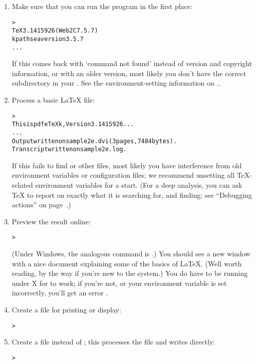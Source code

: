 \documentclass{article}
\begin{document}
\begin{enumerate}

\item Make sure that you can run the  program in the first
place:

\begin{alltt}
> 
TeX 3.1415926 (Web2C 7.5.7)
kpathsea version 3.5.7
...
\end{alltt}
If this comes back with `command not found' instead of version and
copyright information, or with an older version, most likely you don't
have the correct  subdirectory in your .  See
the environment-setting information on \p.\pageref{sec:env}.

\item Process a basic \LaTeX{} file:
\begin{alltt}
> 
This is pdfeTeXk, Version 3.1415926...
...
Output written on sample2e.dvi (3 pages, 7484 bytes).
Transcript written on sample2e.log.
\end{alltt}
If this fails to find  or other files, most
likely you have interference from old environment variables or
configuration files; we recommend unsetting all \TeX-related environment
variables for a start.  (For a deep analysis, you can ask \TeX{} to
report on exactly what it is searching for, and finding; see ``Debugging
actions'' on page~\pageref{sec:debugging}.)

\item Preview the result online:
\begin{alltt}
> 
\end{alltt}
(Under Windows, the analogous command is .)  You should
see a new window with a nice document explaining some of the basics of
\LaTeX{}.  (Well worth reading, by the way if you're new to the system.)
You do have to be running under X for  to work; if you're
not, or your  environment variable is set incorrectly,
you'll get an error .

\item Create a \PS{} file for printing or display:
\begin{alltt}
> 
\end{alltt}

\item Create a  file instead of \dvi{}; this processes the
 file and writes  directly:
\begin{alltt}
> 
\end{alltt}


\end{enumerate}
\end{document}
